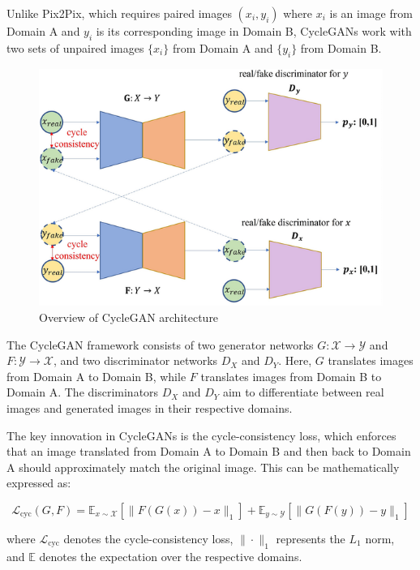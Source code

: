 \documentclass[12pt,DIV14,BCOR12mm,a4paper,footinclude=false,headinclude,parskip=half-,twoside,openright,cleardoublepage=empty,toc=index,bibliography=totoc,listof=totoc]{scrreprt}
\numberwithin{equation}{chapter}
\begin{document}
Unlike Pix2Pix, which requires paired images \((x_i, y_i)\) where \(x_i\) is an image from Domain A and \(y_i\) is its corresponding image in Domain B, CycleGANs work with two sets of unpaired images \(\{x_i\}\) from Domain A and \(\{y_i\}\) from Domain B.
\begin{figure}
	\centering
	\includegraphics[scale=.7]{../media/Overview-of-CycleGAN-architecture.png}
	\caption{Overview of CycleGAN architecture\cite{article}}
	\label{cycleGAN}
\end{figure}
The CycleGAN framework consists of two generator networks \(G: \mathcal{X} \to \mathcal{Y}\) and \(F: \mathcal{Y} \to \mathcal{X}\), and two discriminator networks \(D_X\) and \(D_Y\). Here, \(G\) translates images from Domain A to Domain B, while \(F\) translates images from Domain B to Domain A. The discriminators \(D_X\) and \(D_Y\) aim to differentiate between real images and generated images in their respective domains.

The key innovation in CycleGANs is the cycle-consistency loss, which enforces that an image translated from Domain A to Domain B and then back to Domain A should approximately match the original image. This can be mathematically expressed as:

\begin{equation}
\mathcal{L}_{\text{cyc}}(G, F) = \mathbb{E}_{x \sim \mathcal{X}}[\|F(G(x)) - x\|_1] + \mathbb{E}_{y \sim \mathcal{Y}}[\|G(F(y)) - y\|_1]
\end{equation}

where \(\mathcal{L}_{\text{cyc}}\) denotes the cycle-consistency loss, \(\| \cdot \|_1\) represents the \(L_1\) norm, and \(\mathbb{E}\) denotes the expectation over the respective domains.
\end{document}
